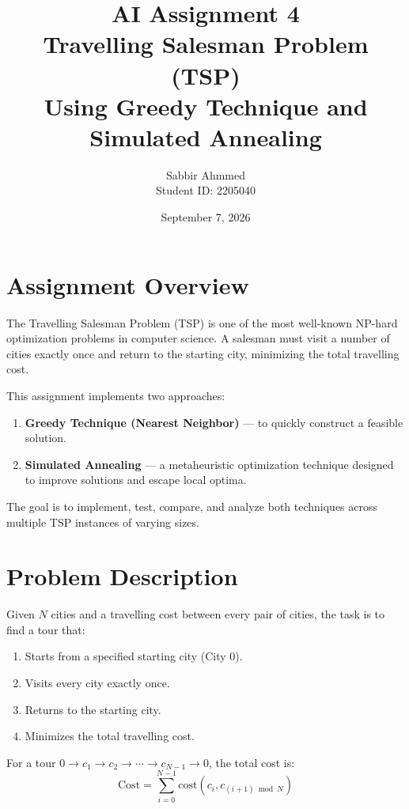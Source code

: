 \documentclass[12pt,a4paper]{article}
\title{\textbf{AI Assignment 4}\\[0.3em]
\Large Travelling Salesman Problem (TSP)\\
Using Greedy Technique and Simulated Annealing}
\author{Sabbir Ahmmed\\Student ID: 2205040}
\date{September 7, 2026}
\begin{document}
\maketitle
\tableofcontents
\newpage

\section{Assignment Overview}

The Travelling Salesman Problem (TSP) is one of the most well-known NP-hard optimization problems in computer science. A salesman must visit a number of cities exactly once and return to the starting city, minimizing the total travelling cost.

This assignment implements two approaches:
\begin{enumerate}
    \item \textbf{Greedy Technique (Nearest Neighbor)} --- to quickly construct a feasible solution.
    \item \textbf{Simulated Annealing} --- a metaheuristic optimization technique designed to improve solutions and escape local optima.
\end{enumerate}

The goal is to implement, test, compare, and analyze both techniques across multiple TSP instances of varying sizes.

\section{Problem Description}

Given $N$ cities and a travelling cost between every pair of cities, the task is to find a tour that:
\begin{enumerate}
    \item Starts from a specified starting city (City 0).
    \item Visits every city exactly once.
    \item Returns to the starting city.
    \item Minimizes the total travelling cost.
\end{enumerate}

For a tour $0 \to c_1 \to c_2 \to \cdots \to c_{N-1} \to 0$, the total cost is:
\[
\text{Cost} = \sum_{i=0}^{N-1} \text{cost}(c_i, c_{(i+1) \bmod N})
\]
\end{document}

